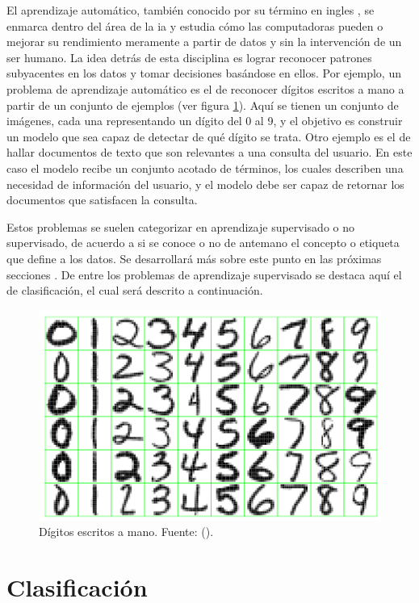 El aprendizaje automático, también conocido por su término en ingles
, se enmarca dentro del área de la
\acrfull{ia} y estudia cómo las computadoras pueden  o
mejorar su rendimiento meramente a partir de datos y sin la intervención de un
ser humano.  La idea detrás de esta disciplina es lograr reconocer patrones
subyacentes en los datos y tomar decisiones basándose en ellos. Por ejemplo, un
problema de aprendizaje automático es el de reconocer dígitos escritos a mano a
partir de un conjunto de ejemplos (ver figura \ref{fig:reconocimiento_digitos}).
Aquí se tienen un conjunto de imágenes, cada una representando un dígito del 0
al 9, y el objetivo es construir un modelo que sea capaz de detectar de qué
dígito se trata. Otro ejemplo es el de hallar documentos de texto que son
relevantes a una consulta del usuario. En este caso el modelo recibe un conjunto
acotado de términos, los cuales describen una necesidad de información del
usuario, y el modelo debe ser capaz de retornar los documentos que satisfacen la
consulta.  

Estos problemas se suelen categorizar en aprendizaje supervisado o no
supervisado, de acuerdo a si se conoce o no de antemano el concepto o etiqueta
que define a los datos. Se desarrollará más sobre este punto en las próximas
secciones . De
entre los problemas de aprendizaje supervisado se destaca aquí el de
clasificación, el cual será descrito a continuación.

\begin{figure}
   \includegraphics[width=0.66\linewidth]{figures/digits_recognition_v2.png}
   \centering
   \caption{Dígitos escritos a mano. Fuente: 
   (\citeyear{hastie_elements_2009}).}
   \label{fig:reconocimiento_digitos}
\end{figure}

\section{Clasificación}

